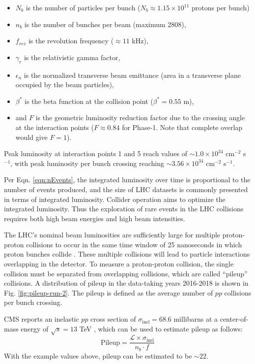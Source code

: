 \begin{itemize}
    \item $N_b$ is the number of particles per bunch ($N_b \approx 1.15 \times 10^{11}$ protons per bunch)
    \item $n_b$ is the number of bunches per beam (maximum 2808),
    \item $f_{rev}$ is the revolution frequency ($\approx 11$ kHz),
    \item $\gamma_r$ is the relativistic gamma factor,
    \item $\epsilon_n$ is the normalized transverse beam emittance (area in a transverse plane occupied by the beam particles),
    \item $\beta^*$ is the beta function at the collision point ($\beta^* = 0.55$ m),
    \item and $F$ is the geometric luminosity reduction factor due to the crossing angle at the interaction points ($F \approx 0.84$ for Phase-1. Note that complete overlap would give $F = 1$).
\end{itemize}
Peak luminosity at interaction points 1 and 5 reach values of $\sim 1.0 \times 10^{34}$ cm$^{-2}$ s$^{-1}$, with peak luminosity per bunch crossing reaching $\sim 3.56 \times 10^{34}$ cm$^{-2}$ s$^{-1}$.

Per Eqn. \ref{eqn:nEvents}, the integrated luminosity over time is proportional to the number of events produced, and the size of LHC datasets is commonly presented in terms of integrated luminosity. Collider operation aims to optimize the integrated luminosity. Thus the exploration of rare events in the LHC collisions requires both high beam energies and high beam intensities.

The LHC's nominal beam luminosities are sufficiently large for multiple proton-proton collisions to occur in the same time window of 25 nanoseconds in which proton bunches collide \cite{CMS-JME-18-001}. These multiple collisions will lead to particle interactions overlapping in the detector. To measure a proton-proton collision, the single collision must be separated from overlapping collisions, which are called ``pileup'' collisions. A distribution of pileup in the data-taking years 2016-2018 is shown in Fig. \ref{fig:pileup-run-2}. The pileup is defined as the average number of $pp$ collisions per bunch crossing.

CMS reports an inelastic $pp$ cross section of $\sigma_{\text{inel}} = 68.6$ millibarns at a center-of-mass energy of $\sqrt{s} = 13$ TeV \cite{CERN-EP-2018-004-pileup}, which can be used to estimate pileup as follows:
\begin{equation}
    \text{Pileup} = \frac{\mathcal{L} \times \sigma_{\text{inel}}}{ n_b \cdot f}
\end{equation}
With the example values above, pileup can be estimated to be $\sim 22$.

